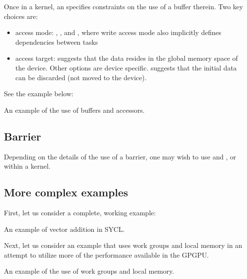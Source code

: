 Once in a kernel, an  specifies constraints on the use of a buffer therein. 
Two key choices are:
\begin{itemize}
\item access mode: , , and , where write access mode also implicitly defines dependencies between tasks
\item access target:  suggests that the data resides in the global memory space of the device. Other options are device specific.  suggests that the initial data can be discarded (not moved to the device). 
\end{itemize}

See the example below:
\raggedbottom
\begin{codebox}[]{\href{https://godbolt.org/z/}{\ExternalLink}}
\footnotesize An example of the use of buffers and accessors.
\tcblower
{}
\end{codebox}

\subsection{Barrier}

Depending on the details of the use of a barrier, one may wish to use  and , or  within a kernel.


\subsection{More complex examples}

First, let us consider a complete, working example:

\raggedbottom
\begin{codebox}[]{\href{https://godbolt.org/z/}{\ExternalLink}}
\footnotesize An example of vector addition in SYCL.
\tcblower
{}
\end{codebox}

Next, let us consider an example that uses work groups and local memory in an attempt to utilize more of the performance available in the GPGPU. 

\raggedbottom
\begin{codebox}[]{\href{https://godbolt.org/z/}{\ExternalLink}}
\footnotesize An example of the use of work groups and local memory.
\tcblower
{}
\end{codebox}
         
